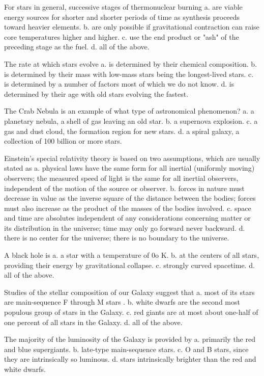     For stars in general, successive stages of thermonuclear burning
    a. are viable energy sources for shorter and shorter periods of time as synthesis proceeds toward heavier elements.
    b. are only possible if gravitational contraction can raise core temperatures higher and higher.
    c. use the end product or "ash" of the preceding stage as the fuel.
    d. all of the above.

    The rate at which stars evolve
    a. is determined by their chemical composition.
    b. is determined by their mass with low-mass stars being the longest-lived stars.
    c. is determined by a number of factors most of which we do not know.
    d. is determined by their age with old stars evolving the fastest.

    The Crab Nebula is an example of what type of astronomical phenomenon?
    a. a planetary nebula, a shell of gas leaving an old star.
    b. a supernova explosion.
    c. a gas and dust cloud, the formation region for new stars.
    d. a spiral galaxy, a collection of 100 billion or more stars.

    Einstein's special relativity theory is based on two assumptions, which are usually stated as
    a. physical laws have the same form for all inertial (uniformly moving) observers; the measured speed of light is the same for all inertial observers, independent of the motion of the source or observer.
    b. forces in nature must decrease in value as the inverse square of the distance between the bodies; forces must also increase as the product of the masses of the bodies involved.
    c. space and time are absolutes independent of any considerations concerning matter or its distribution in the universe; time may only go forward never backward.
    d. there is no center for the universe; there is no boundary to the universe.

    A black hole is
    a. a star with a temperature of 0o K.
    b. at the centers of all stars, providing their energy by gravitational collapse.
    c. strongly curved spacetime.
    d. all of the above.

    Studies of the stellar composition of our Galaxy suggest that
    a. most of its stars are main-sequence F through M stars
    . b. white dwarfs are the second most populous group of stars in the Galaxy.
    c. red giants are at most about one-half of one percent of all stars in the Galaxy.
    d. all of the above.

    The majority of the luminosity of the Galaxy is provided by
    a. primarily the red and blue supergiants.
    b. late-type main-sequence stars.
    c. O and B stars, since they are intrinsically so luminous.
    d. stars intrinsically brighter than the red and white dwarfs.

